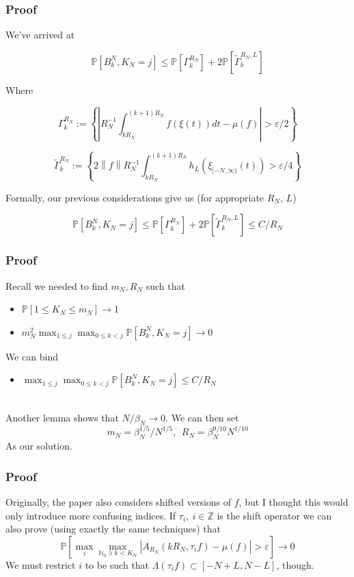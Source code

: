 \documentclass{beamer}
\newcommand{\norm}[1]{{\left\lVert#1\right\rVert}}
\begin{document}
\begin{frame}
    \frametitle{Proof}
    We've arrived at

    \[
        \mathbb{P}\left[ B^N_k, K_N = j \right] \leq \mathbb{P}\left[\Gamma_k^{R_N}\right] + 2\mathbb{P}\left[\tilde{\Gamma}_k^{R_N, L}\right]
    \]

    Where

    \[
        \Gamma_k^{R_N} := \left\{  \left|R_N^{-1}\int_{kR_N}^{(k+1)R_N}f(\xi(t))dt - \mu(f)\right| > \varepsilon/2\right\}
    \]

    \[
        \tilde{\Gamma}_k^{R_N} := \left\{  2\norm{f}R_N^{-1}\int_{kR_N}^{(k+1)R_N}h_L(\xi_{[-N, \infty)}(t)) > \varepsilon/4\right\}
    \]

    Formally, our previous considerations give us (for appropriate $R_N$, $L$)

    \[
        \mathbb{P}\left[ B^N_k, K_N = j \right] \leq \mathbb{P}\left[\Gamma_k^{R_N}\right] + 2\mathbb{P}\left[\tilde{\Gamma}_k^{R_N, L}\right] \leq C/R_N
    \]
\end{frame}

\begin{frame}
    \frametitle{Proof}
    Recall we needed to find $m_N, R_N$ such that 
    \begin{itemize}
        \item $\mathbb{P}[1 \leq K_N \leq m_N] \rightarrow 1$
        \item $m_N^2\max_{1 \leq j}\max_{0 \leq k < j}\mathbb{P}\left[ B^N_k, K_{N} = j \right] \rightarrow 0$
    \end{itemize}
    We can bind
    \begin{itemize}
        \item $\max_{1 \leq j}\max_{0 \leq k < j}\mathbb{P}\left[ B^N_k, K_{N} = j \right] \leq C/R_N$
    \end{itemize}
    ~\\
    Another lemma shows that $N/\beta_N \rightarrow 0$. We can then set 
    \[m_N = \beta_N^{1/5}/N^{1/5}, \ \  R_N = \beta_N^{9/10} N^{1/10}\]
    As our solution.
\end{frame}

\begin{frame}
    \frametitle{Proof}
    Originally, the paper also considers shifted versions of $f$, but I thought this would only introduce more confusing indices. If $\tau_i,\ i\in \mathbb{Z}$ is the shift operator
    we can also prove (using exactly the same techniques) that
          \[
              \mathbb{P}\left[ \max_{i}\max_{\mathbb{N}_0 \ni k < K_N}|A_{R_N}(kR_N, \tau_if) - \mu(f)| > \varepsilon\right] \rightarrow 0
          \]
    We must restrict $i$ to be such that $\Lambda(\tau_if) \subset [-N+L, N-L]$, though.
    \\~\\
\end{frame}
\end{document}
